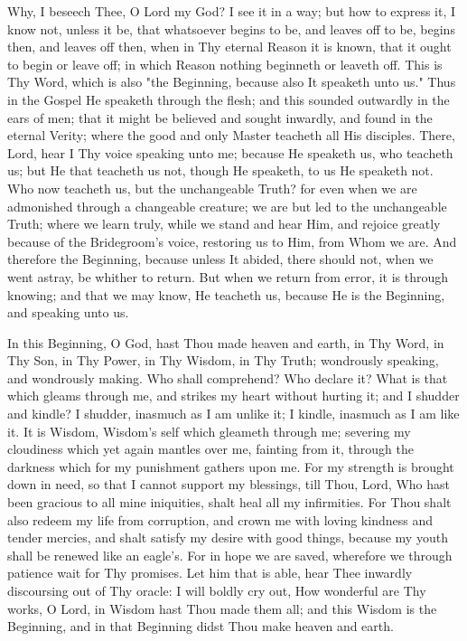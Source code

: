 \documentclass[b5paper,openright,12pt,twoside]{book}
\begin{document}
Why, I beseech Thee, O Lord my God? I see it in a way; but how to
express it, I know not, unless it be, that whatsoever begins to be, and
leaves off to be, begins then, and leaves off then, when in Thy eternal
Reason it is known, that it ought to begin or leave off; in which Reason
nothing beginneth or leaveth off. This is Thy Word, which is also "the
Beginning, because also It speaketh unto us." Thus in the Gospel He
speaketh through the flesh; and this sounded outwardly in the ears of
men; that it might be believed and sought inwardly, and found in
the eternal Verity; where the good and only Master teacheth all His
disciples. There, Lord, hear I Thy voice speaking unto me; because He
speaketh us, who teacheth us; but He that teacheth us not, though
He speaketh, to us He speaketh not. Who now teacheth us, but the
unchangeable Truth? for even when we are admonished through a changeable
creature; we are but led to the unchangeable Truth; where we learn
truly, while we stand and hear Him, and rejoice greatly because of the
Bridegroom's voice, restoring us to Him, from Whom we are. And therefore
the Beginning, because unless It abided, there should not, when we
went astray, be whither to return. But when we return from error, it is
through knowing; and that we may know, He teacheth us, because He is the
Beginning, and speaking unto us.

In this Beginning, O God, hast Thou made heaven and earth, in Thy
Word, in Thy Son, in Thy Power, in Thy Wisdom, in Thy Truth; wondrously
speaking, and wondrously making. Who shall comprehend? Who declare
it? What is that which gleams through me, and strikes my heart without
hurting it; and I shudder and kindle? I shudder, inasmuch as I am unlike
it; I kindle, inasmuch as I am like it. It is Wisdom, Wisdom's self
which gleameth through me; severing my cloudiness which yet again
mantles over me, fainting from it, through the darkness which for my
punishment gathers upon me. For my strength is brought down in need,
so that I cannot support my blessings, till Thou, Lord, Who hast been
gracious to all mine iniquities, shalt heal all my infirmities. For
Thou shalt also redeem my life from corruption, and crown me with loving
kindness and tender mercies, and shalt satisfy my desire with good
things, because my youth shall be renewed like an eagle's. For in hope
we are saved, wherefore we through patience wait for Thy promises. Let
him that is able, hear Thee inwardly discoursing out of Thy oracle: I
will boldly cry out, How wonderful are Thy works, O Lord, in Wisdom
hast Thou made them all; and this Wisdom is the Beginning, and in that
Beginning didst Thou make heaven and earth.
\end{document}
